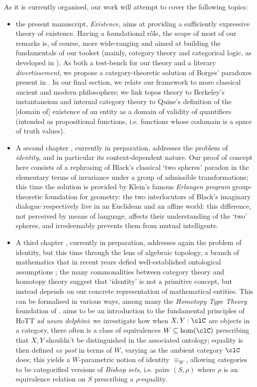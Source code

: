 As it is currently organised, our work will attempt to cover the following topics:
\begin{itemize}
    \item the present manuscript, \emph{Existence}, aims at providing a sufficiently expressive theory of existence. Having a foundational r\^ole, the scope of most of our remarks is, of course, more wide-ranging and aimed at building the fundamentals of our toolset (mainly, category theory and categorical logic, as developed in \cite{mac1992sheaves,JohnstonePT,lambek1988introduction}). As both a test-bench for our theory and a literary \emph{divertissement}, we propose a category-theoretic solution of Borges' paradoxes present in \cite{Borges1963}. In our final section, we relate our framework to more classical ancient and modern philosophers; we link topos theory to Berkeley's instantaneism and internal category theory to Quine's definition of the [domain of] existence of an entity as a domain of validity of quantifiers (intended as propositional functions, i.e. functions whose codomain is a space of truth values).
    \item A second chapter \cite{black}, currently in preparation, addresses the problem of \emph{identity}, and in particular its context-dependent nature. Our proof of concept here consists of a rephrasing of Black's classical `two spheres' paradox \cite{papear_di_black} in the elementary terms of invariance under a group of admissible transformations; this time the solution is provided by Klein's famous \emph{Erlangen program} group-theoretic foundation for geometry: the two interlocutors of Black's imaginary dialogue respectively live in an Euclidean and an affine world: this difference, not perceived by means of language, affects their understanding of the `two' spheres, and irredeemably prevents them from mutual intelligente.
    \item A third chapter \cite{homot}, currently in preparation, addresses again the problem of identity, but this time through the lens of algebraic topology, a branch of mathematics that in recent years defied well\hyp{}established ontological assumptions ; the many commonalities between category theory and homotopy theory suggest that `identity' is not a primitive concept, but instead depends on our concrete representation of mathematical entities. This can be formalised in various ways, among many the \emph{Homotopy Type Theory} foundation of \cite{hottbook,cwp}. \cite{homot} aims to be an introduction to the fundamental principles of HoTT \emph{ad usum delphini}: we investigate how when $X,Y : \clC$ are objects in a category, there often is a class of equivalences $W \subseteq \hom(\clC)$ prescribing that $X,Y$ shouldn't be distinguished in the associated ontology; equality is then defined \emph{ex post} in terms of $W$, varying as the ambient category $\clC$ does; this yields a $W$-parametric notion of identity $\equiv_W$, allowing categories to be categorified versions of \emph{Bishop sets}, i.e. pairs $(S,\rho)$ where $\rho$ is an equivalence relation on $S$ prescribing a $\rho$-equality.
\end{itemize}
